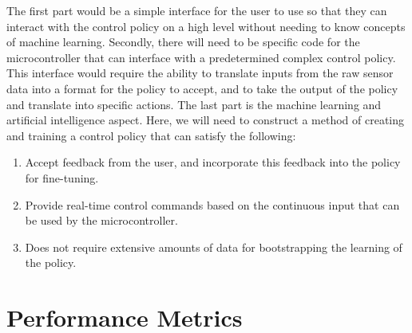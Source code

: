 \documentclass[letterpaper,10pt]{article}
\begin{document}
The first part would be a simple interface for the user to use so that they can interact with the control policy on a high level without needing to know concepts of machine learning.
Secondly, there will need to be specific code for the microcontroller that can interface with a predetermined complex control policy.
This interface would require the ability to translate inputs from the raw sensor data into a format for the policy to accept, and to take the  output of the policy and translate into specific actions.
The last part is the machine learning and artificial intelligence aspect.
Here, we will need to construct a method of creating and training a control policy that can satisfy the following:
\begin{enumerate}
	\item Accept feedback from the user, and incorporate this feedback into the policy for fine-tuning.
	\item Provide real-time control commands based on the continuous input that can be used by the microcontroller.
	\item Does not require extensive amounts of data for bootstrapping the learning of the policy.
\end{enumerate}

\section{Performance Metrics}
\end{document}
